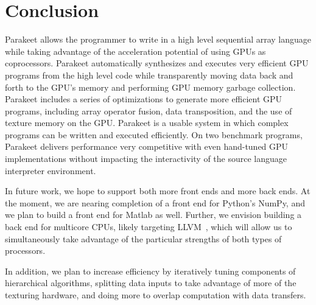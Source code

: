 \documentclass[preprint]{sigplanconf}
\begin{document}
\section{Conclusion}
\label{Conclusion}

Parakeet allows the programmer to write in a high level sequential array language while taking advantage of the acceleration potential of using GPUs as coprocessors. Parakeet automatically synthesizes and executes very efficient GPU programs from the high level code while transparently moving data back and forth to the GPU's memory and performing GPU memory garbage collection. Parakeet includes a series of optimizations to generate more efficient GPU programs, including array operator fusion, data transposition, and the use of texture memory on the GPU.  Parakeet is a usable system in which complex programs can be written and executed efficiently.  On two benchmark programs, Parakeet delivers performance very competitive with even hand-tuned GPU implementations without impacting the interactivity of the source language interpreter environment.

In future work, we hope to support both more front ends and more back ends.  At the moment, we are nearing completion of a front end for Python's NumPy, and we plan to build a front end for Matlab as well.  Further, we envision building a back end for multicore CPUs, likely targeting LLVM~\cite{Latt02}, which will allow us to simultaneously take advantage of the particular strengths of both types of processors.

In addition, we plan to increase efficiency by iteratively tuning components of hierarchical algorithms, splitting data inputs to take advantage of more of the texturing hardware, and doing more to overlap computation with data transfers.


{}
\end{document}
